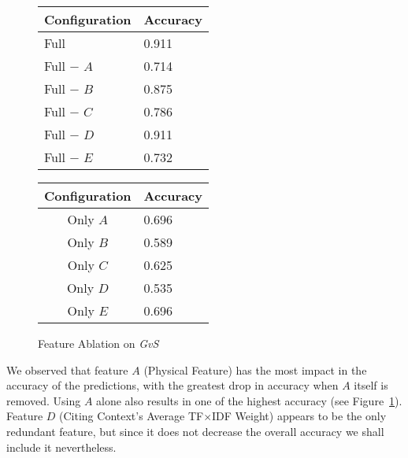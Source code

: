 \begin{figure}[ht]
\begin{minipage}[b]{0.45\linewidth}\centering
\begin{tabular}{ l | l }
Configuration & Accuracy \\
\hline
Full			& 0.911 \\
Full $-$ $A$	& 0.714 \\
Full $-$ $B$	& 0.875 \\
Full $-$ $C$	& 0.786 \\
Full $-$ $D$	& 0.911 \\
Full $-$ $E$	& 0.732 \\
\end{tabular}
\end{minipage}
\hspace{0.5cm}
\begin{minipage}[b]{0.45\linewidth}\centering
\begin{tabular}{ c | l }
Configuration & Accuracy \\
\hline
Only $A$	& 0.696 \\
Only $B$	& 0.589 \\
Only $C$	& 0.625 \\
Only $D$	& 0.535 \\
Only $E$	& 0.696 \\
\end{tabular}
\end{minipage}
\caption{Feature Ablation on {\it GvS}}
\label{fig:ablation_first}
\end{figure}

We observed that feature $A$ (Physical Feature) has the most impact in the accuracy of the predictions, with the greatest drop in accuracy when $A$ itself is removed.  Using $A$ alone also results in one of the highest accuracy (see Figure~\ref{fig:ablation_first}). Feature $D$ (Citing Context's Average TF$\times$IDF Weight) appears to be the only redundant feature, but since it does not decrease the overall accuracy we shall include it nevertheless.

